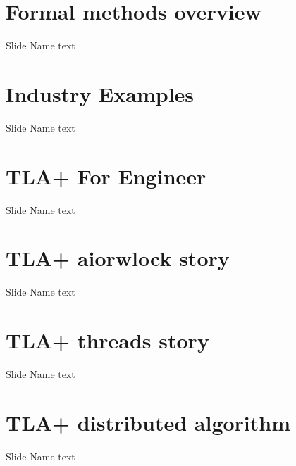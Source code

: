 \documentclass[12pt]{beamer}
\begin{document}
  \section{Formal methods overview}
  \begin{frame}{Slide Name}
      text
  \end{frame}
  \section{Industry Examples}
  \begin{frame}{Slide Name}
      text
  \end{frame}
  \section{TLA+ For Engineer}
  \begin{frame}{Slide Name}
      text
  \end{frame}
  \section{TLA+ aiorwlock story}
  \begin{frame}{Slide Name}
      text
  \end{frame}
  \section{TLA+ threads story}
  \begin{frame}{Slide Name}
      text
  \end{frame}
  \section{TLA+ distributed algorithm}
  \begin{frame}{Slide Name}
      text
  \end{frame}
\end{document}
